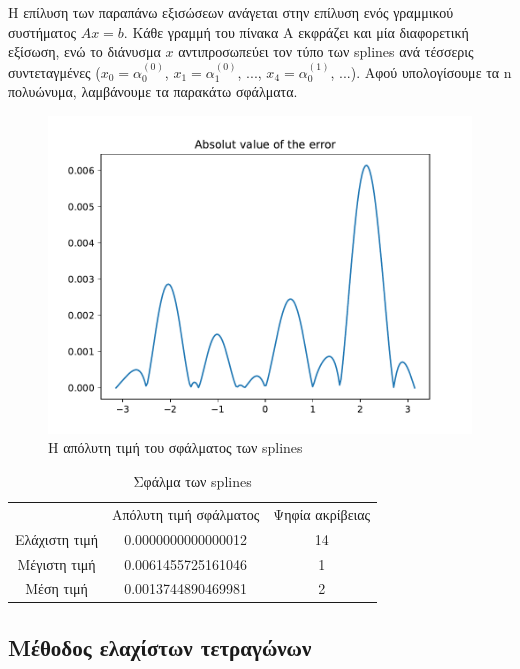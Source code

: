 \documentclass[a4paper,11pt]{article}
\newcommand{\lt}{\latintext}
\newcommand{\gt}{\greektext}
\begin{document}
Η επίλυση των παραπάνω εξισώσεων ανάγεται στην επίλυση ενός γραμμικού συστήματος $Ax = b$. Κάθε γραμμή του πίνακα Α εκφράζει και μία διαφορετική εξίσωση, ενώ το διάνυσμα $x$ αντιπροσωπεύει τον τύπο των \lt splines \gt ανά τέσσερις συντεταγμένες ($x_0=\alpha_0^{(0)}$, $x_1=\alpha_1^{(0)}$, ..., $x_4=\alpha_0^{(1)}$, ...). Αφού υπολογίσουμε τα \lt n \gt πολυώνυμα, λαμβάνουμε τα παρακάτω σφάλματα.

\begin{figure}[h!]
    \centering
    \includegraphics[width=0.8\linewidth]{images/figure5b.pdf}
    \centering
     \caption{Η απόλυτη τιμή του σφάλματος των \lt splines}
    \label{fig:fig5b}
\end{figure}

\begin{table}[h]
\centering
\label{fig:table5b}
\begin{tabular}{c c c}
   \gt & Απόλυτη τιμή σφάλματος & Ψηφία ακρίβειας \\
   Ελάχιστη τιμή & 0.0000000000000012 & 14 \\
   Μέγιστη τιμή & 0.0061455725161046 & 1 \\
   Μέση τιμή & 0.0013744890469981 & 2 \\
\end{tabular}
\caption{\gt Σφάλμα των \lt splines}
\end{table}

\subsection{\gt Μέθοδος ελαχίστων τετραγώνων}
\end{document}
